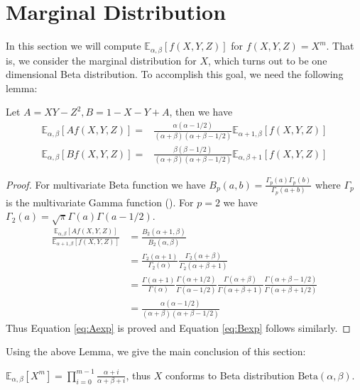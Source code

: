 \documentclass[twoside]{article}%
\def\E{\mathbb{E}}
\def\Beta{\textrm{Beta}}
\begin{document}
\section{Marginal Distribution}
In this section we will compute $\E_{\alpha,\beta}[f(X,Y, Z)]$
for $f(X,Y,Z)=X^m$. That is, we consider the marginal distribution for $X$,
which turns out to be one dimensional Beta distribution.
To accomplish this goal, we need the following lemma:
\begin{lemma}\label{lem:AB}
Let $A = XY - Z^2, B = 1 - X - Y + A$, then we have
\begin{align}
\E_{\alpha, \beta}[Af(X,Y,Z)] =&
\frac{\alpha(\alpha-1/2)}{(\alpha+\beta)(\alpha+\beta-1/2)}\E_{\alpha+1, \beta}[f(X,Y,Z)]
\label{eq:Aexp} \\
\E_{\alpha,\beta}[Bf(X,Y,Z)] =&
\frac{\beta(\beta-1/2)}{(\alpha+\beta)(\alpha+\beta-1/2)}\E_{\alpha, \beta+1}[f(X,Y,Z)]
\label{eq:Bexp}
\end{align}
\end{lemma}
\begin{proof}
For multivariate Beta function we have
$B_p(a, b) = \frac{\Gamma_p(a)\Gamma_p(b)}{\Gamma_p(a+b)}$
where $\Gamma_p$ is the multivariate Gamma function (\cite{ingham_1933}).
For $p=2$ we have $\Gamma_2(a) = \sqrt{\pi}\Gamma(a)\Gamma(a-1/2)$.
\begin{align*}
\frac{\E_{\alpha, \beta}[Af(X,Y,Z)]}{\E_{\alpha+1, \beta}[f(X,Y,Z)]} &
=\frac{B_2(\alpha+1,\beta)}{B_2(\alpha,\beta)}\\
&=\frac{\Gamma_2(\alpha+1)}{\Gamma_2(\alpha)}
\frac{\Gamma_2(\alpha+\beta)}{\Gamma_2(\alpha+\beta+1)}\\
& =\frac{\Gamma(\alpha+1)}{\Gamma(\alpha)}
\frac{\Gamma(\alpha+1/2)}{\Gamma(\alpha-1/2)}
\frac{\Gamma(\alpha+\beta)}{\Gamma(\alpha+\beta+1)}
\frac{\Gamma(\alpha+\beta-1/2)}{\Gamma(\alpha+\beta+1/2)}\\
&=\frac{\alpha(\alpha-1/2)}{(\alpha+\beta)(\alpha+\beta-1/2)}
\end{align*}
Thus Equation \eqref{eq:Aexp} is proved and Equation \eqref{eq:Bexp} follows similarly.
\end{proof}
Using the above Lemma, we give the main conclusion of this section:
\begin{theorem}\label{thm:Xm}
$\E_{\alpha, \beta}[X^m] =
\prod_{i=0}^{m-1}\frac{\alpha+i}{\alpha+\beta+i}$, thus $X$
conforms to Beta distribution $\Beta(\alpha, \beta)$.
\end{theorem}
\end{document}
